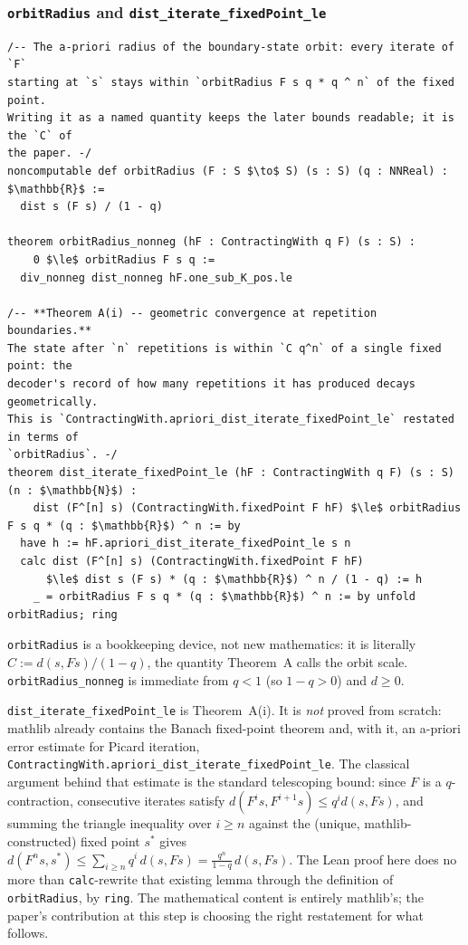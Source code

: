 \documentclass[11pt]{article}
\begin{document}
\subsubsection*{\texttt{orbitRadius} and \texttt{dist\_iterate\_fixedPoint\_le}}

\begin{lstlisting}
/-- The a-priori radius of the boundary-state orbit: every iterate of `F`
starting at `s` stays within `orbitRadius F s q * q ^ n` of the fixed point.
Writing it as a named quantity keeps the later bounds readable; it is the `C` of
the paper. -/
noncomputable def orbitRadius (F : S $\to$ S) (s : S) (q : NNReal) : $\mathbb{R}$ :=
  dist s (F s) / (1 - q)

theorem orbitRadius_nonneg (hF : ContractingWith q F) (s : S) :
    0 $\le$ orbitRadius F s q :=
  div_nonneg dist_nonneg hF.one_sub_K_pos.le

/-- **Theorem A(i) -- geometric convergence at repetition boundaries.**
The state after `n` repetitions is within `C q^n` of a single fixed point: the
decoder's record of how many repetitions it has produced decays geometrically.
This is `ContractingWith.apriori_dist_iterate_fixedPoint_le` restated in terms of
`orbitRadius`. -/
theorem dist_iterate_fixedPoint_le (hF : ContractingWith q F) (s : S) (n : $\mathbb{N}$) :
    dist (F^[n] s) (ContractingWith.fixedPoint F hF) $\le$ orbitRadius F s q * (q : $\mathbb{R}$) ^ n := by
  have h := hF.apriori_dist_iterate_fixedPoint_le s n
  calc dist (F^[n] s) (ContractingWith.fixedPoint F hF)
      $\le$ dist s (F s) * (q : $\mathbb{R}$) ^ n / (1 - q) := h
    _ = orbitRadius F s q * (q : $\mathbb{R}$) ^ n := by unfold orbitRadius; ring
\end{lstlisting}

\texttt{orbitRadius} is a bookkeeping device, not new mathematics: it is
literally $C := d(s, Fs)/(1-q)$, the quantity Theorem~A calls the
orbit scale. \texttt{orbitRadius\_nonneg} is immediate from $q<1$ (so
$1-q>0$) and $d\ge 0$.

\texttt{dist\_iterate\_fixedPoint\_le} is Theorem~A(i). It is \emph{not}
proved from scratch: mathlib already contains the Banach fixed-point theorem
and, with it, an a-priori error estimate for Picard iteration,
\texttt{ContractingWith.apriori\_dist\_iterate\_fixedPoint\_le}. The classical
argument behind that estimate is the standard telescoping bound: since $F$ is
a $q$-contraction, consecutive iterates satisfy $d(F^i s, F^{i+1}s) \le q^i
d(s,Fs)$, and summing the triangle inequality over $i \ge n$ against the
(unique, mathlib-constructed) fixed point $s^\ast$ gives
$d(F^n s, s^\ast) \le \sum_{i \ge n} q^i\, d(s,Fs) = \frac{q^n}{1-q}\,d(s,Fs)$.
The Lean proof here does no more than \texttt{calc}-rewrite that existing
lemma through the definition of \texttt{orbitRadius}, by \texttt{ring}. The
mathematical content is entirely mathlib's; the paper's contribution at this
step is choosing the right restatement for what follows.
\end{document}
